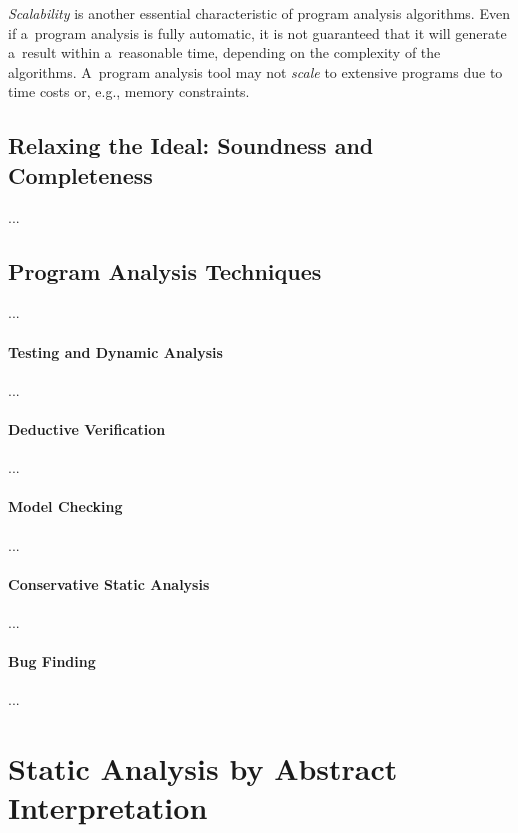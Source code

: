 \emph{Scalability} is another essential characteristic of program analysis algorithms. Even if a~program analysis is fully automatic, it is not guaranteed that it will generate a~result within a~reasonable time, depending on the complexity of the algorithms. A~program analysis tool may not \emph{scale} to extensive programs due to time costs or, e.g., memory constraints.

\subsection{Relaxing the Ideal: Soundness and Completeness}

...

\subsection{Program Analysis Techniques}
\label{sec:analysisTechniques}

...

\paragraph{Testing and Dynamic Analysis}
...

\paragraph{Deductive Verification}
...

\paragraph{Model Checking}
...

\paragraph{Conservative Static Analysis}
...

\paragraph{Bug Finding}
...


\section{Static Analysis by Abstract Interpretation}
\label{sec:statAnalysisAI}


